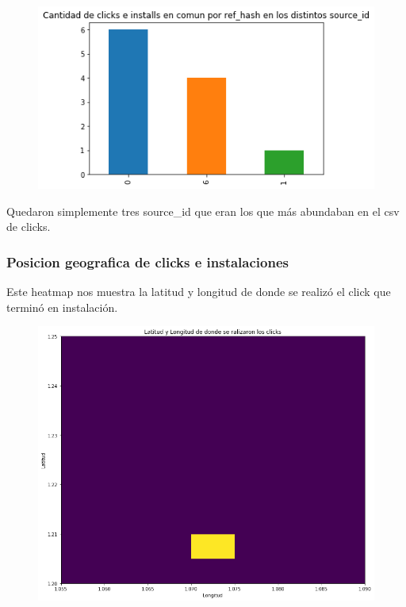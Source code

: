 \documentclass[a4paper, 12pt]{article}
\begin{document}
{	
	
		\begin{figure}[H]
			\centering
			\includegraphics[width=\textwidth]{images/clicks-installs/source_id_bars.png}
			\caption{}
		\end{figure}
	
	
	Quedaron simplemente tres source\_id que eran los que más abundaban en el csv de clicks.
	
	\subsubsection{Posicion geografica de clicks e instalaciones}
	Este heatmap nos muestra la latitud y longitud de donde se realizó el click que terminó en instalación.
	
	
		\begin{figure}[H]
			\centering
			\includegraphics[width=\textwidth]{images/clicks-installs/lat_long_heat.png}
			\caption{}
		\end{figure}
		
}
\end{document}
